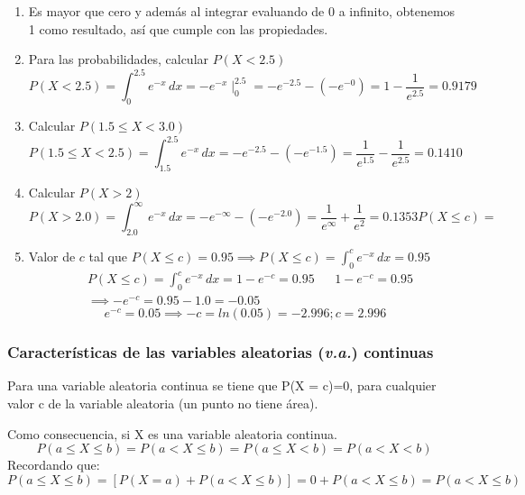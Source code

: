 \begin{enumerate}
    \item Es mayor que cero y además al integrar evaluando de 0 a infinito, obtenemos 1 como resultado, así que cumple con las propiedades.

    \item Para las probabilidades, calcular $P(X<2.5)$
          \begin{equation*}
              P(X<2.5)=\int_0^{2.5}e^{-x}\,dx=-e^{-x}\mid^{2.5}_0=-e^{-2.5}-(-e^{-0})=1-\frac{1}{e^{2.5}}=0.9179
          \end{equation*}
    \item Calcular $P(1.5\leq X<3.0)$
          \begin{equation*}
              P(1.5\leq X<2.5)=\int_{1.5}^{2.5}e^{-x}\,dx=-e^{-2.5}-(-e^{-1.5})=\frac{1}{e^{1.5}}-\frac{1}{e^{2.5}}=0.1410
          \end{equation*}
    \item Calcular $P(X>2)$
          \begin{equation*}
              P(X>2.0)=\int_{2.0}^{\infty} e^{-x}\,dx=-e^{-\infty}-(-e^{-2.0})=\frac{1}{e^{\infty}}  +\frac{1}{e^2}=0.1353P(X\leq c )=
          \end{equation*}
    \item Valor de $c$ tal que $P(X\leq c)=0.95 \implies P(X\leq c )=\int_0^c e^{-x}\,dx=0.95$
          \begin{align*}
               & P(X\leq c)=\int_0^c e^{-x}\,dx=1-e^{-c}=0.95       &  & 1-e^{-c}=0.95\\
               &\implies -e^{-c}=0.95-1.0=-0.05 
          \end{align*}
          \begin{equation*}
              e^{-c}=0.05 \implies -c=ln{(0.05)}=-2.996; c=2.996
          \end{equation*}
\end{enumerate}

\subsubsection{Características de las variables aleatorias (\textit{v.a.}) continuas}

Para una variable aleatoria continua se tiene que P(X = c)=0, para cualquier valor c de la variable aleatoria (un punto no tiene área).

Como consecuencia, si X es una variable aleatoria continua.
\begin{equation}
    P(a\leq X\leq b)=P(a< X\leq b)=P(a\leq X<b)=P(a<X<b)
\end{equation}
Recordando que:
\begin{equation}
    P(a\leq X\leq b)=\left[ P(X=a)+ P(a<X\leq b)\right]=0+P(a< X\leq b)=P(a< X\leq b)
\end{equation}

